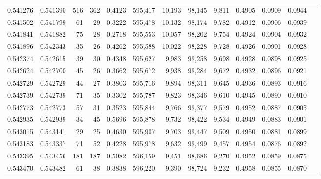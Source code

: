 \begin{tabular}{rrrrrrrrrrrrr}
0.541276 & 0.541390 &   516 &   362 &                                     0.4123 & 595,417 &  10,193 &  98,145 &   9,811 & 0.4905 & 0.0909 & 0.0944 \\
0.541502 & 0.541799 &    61 &    29 &                                     0.3222 & 595,478 &  10,132 &  98,174 &   9,782 & 0.4912 & 0.0906 & 0.0939 \\
0.541841 & 0.541882 &    75 &    28 &                                     0.2718 & 595,553 &  10,057 &  98,202 &   9,754 & 0.4924 & 0.0904 & 0.0932 \\
0.541896 & 0.542343 &    35 &    26 &                                     0.4262 & 595,588 &  10,022 &  98,228 &   9,728 & 0.4926 & 0.0901 & 0.0928 \\
0.542374 & 0.542615 &    39 &    30 &                                     0.4348 & 595,627 &   9,983 &  98,258 &   9,698 & 0.4928 & 0.0898 & 0.0925 \\
0.542624 & 0.542700 &    45 &    26 &                                     0.3662 & 595,672 &   9,938 &  98,284 &   9,672 & 0.4932 & 0.0896 & 0.0921 \\
0.542729 & 0.542729 &    44 &    27 &                                     0.3803 & 595,716 &   9,894 &  98,311 &   9,645 & 0.4936 & 0.0893 & 0.0916 \\
0.542739 & 0.542739 &    71 &    35 &                                     0.3302 & 595,787 &   9,823 &  98,346 &   9,610 & 0.4945 & 0.0890 & 0.0910 \\
0.542773 & 0.542773 &    57 &    31 &                                     0.3523 & 595,844 &   9,766 &  98,377 &   9,579 & 0.4952 & 0.0887 & 0.0905 \\
0.542935 & 0.542939 &    34 &    45 &                                     0.5696 & 595,878 &   9,732 &  98,422 &   9,534 & 0.4949 & 0.0883 & 0.0901 \\
0.543015 & 0.543141 &    29 &    25 &                                     0.4630 & 595,907 &   9,703 &  98,447 &   9,509 & 0.4950 & 0.0881 & 0.0899 \\
0.543183 & 0.543337 &    71 &    52 &                                     0.4228 & 595,978 &   9,632 &  98,499 &   9,457 & 0.4954 & 0.0876 & 0.0892 \\
0.543395 & 0.543456 &   181 &   187 &                                     0.5082 & 596,159 &   9,451 &  98,686 &   9,270 & 0.4952 & 0.0859 & 0.0875 \\
0.543470 & 0.543482 &    61 &    38 &                                     0.3838 & 596,220 &   9,390 &  98,724 &   9,232 & 0.4958 & 0.0855 & 0.0870 \\

\end{tabular}
